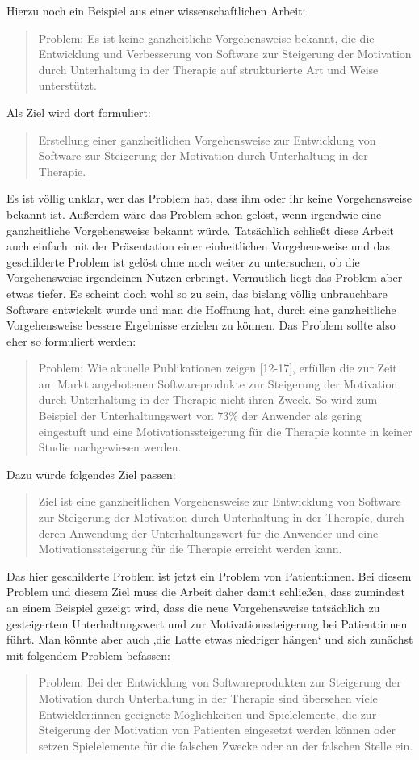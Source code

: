 \documentclass[headsepline,titlepage,twoside,12pt]{report}
\begin{document}
Hierzu noch ein Beispiel aus einer wissenschaftlichen Arbeit:
\blockquote{Problem: Es ist keine ganzheitliche Vorgehensweise bekannt, die die Entwicklung und Verbesserung von Software zur Steigerung der Motivation durch Unterhaltung in der Therapie auf strukturierte Art und Weise unterstützt.}
Als Ziel wird dort formuliert:
\blockquote{Erstellung einer ganzheitlichen Vorgehensweise zur Entwicklung von Software zur Steigerung der Motivation durch Unterhaltung in der Therapie.}
Es ist völlig unklar, wer das Problem hat, dass ihm oder ihr keine Vorgehensweise bekannt ist.
Außerdem wäre das Problem schon gelöst, wenn irgendwie eine ganzheitliche Vorgehensweise bekannt würde.
Tatsächlich schließt diese Arbeit auch einfach mit der Präsentation einer einheitlichen Vorgehensweise und das geschilderte Problem ist gelöst ohne noch weiter zu untersuchen, ob die Vorgehensweise irgendeinen Nutzen erbringt.
Vermutlich liegt das Problem aber etwas tiefer.
Es scheint doch wohl so zu sein, das bislang völlig unbrauchbare Software entwickelt wurde und man die Hoffnung hat, durch eine ganzheitliche Vorgehensweise bessere Ergebnisse erzielen zu können.
Das Problem sollte also eher so formuliert werden:
\blockquote{Problem: Wie aktuelle Publikationen zeigen [12-17], erfüllen die zur Zeit am Markt angebotenen  Softwareprodukte zur Steigerung der Motivation durch Unterhaltung in der Therapie nicht ihren Zweck.
So wird zum Beispiel der Unterhaltungswert von 73\% der Anwender als gering eingestuft und eine Motivationssteigerung für die Therapie konnte in keiner Studie nachgewiesen werden.}
Dazu würde folgendes Ziel passen:
\blockquote{Ziel ist eine ganzheitlichen Vorgehensweise zur Entwicklung von Software zur Steigerung der Motivation durch Unterhaltung in der Therapie, durch deren Anwendung der Unterhaltungswert für die Anwender und eine Motivationssteigerung für die Therapie erreicht werden kann.}
Das hier geschilderte Problem ist jetzt ein Problem von Patient:innen.
Bei diesem Problem und diesem Ziel muss die Arbeit daher damit schließen, dass zumindest an einem Beispiel gezeigt wird, dass die neue Vorgehensweise tatsächlich zu gesteigertem Unterhaltungswert und zur Motivationssteigerung bei Patient:innen führt.
Man könnte aber auch ‚die Latte etwas niedriger hängen‘ und sich zunächst mit folgendem Problem befassen:
\blockquote{Problem: Bei der Entwicklung von Softwareprodukten zur Steigerung der Motivation durch Unterhaltung in der Therapie sind übersehen viele Entwickler:innen geeignete Möglichkeiten und Spielelemente, die zur Steigerung der Motivation von Patienten eingesetzt werden können oder setzen Spielelemente für die falschen Zwecke oder an der falschen Stelle ein.}
\end{document}
